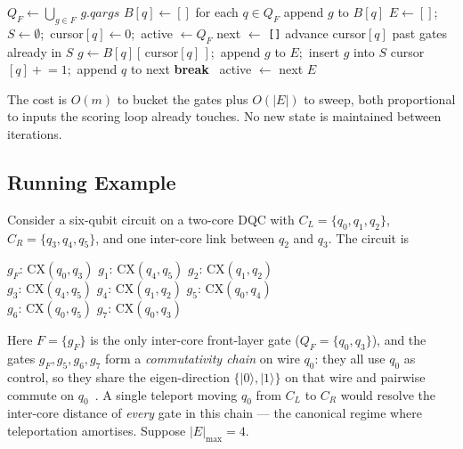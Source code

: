 \documentclass[conference]{IEEEtran}
\begin{document}
\begin{algorithm}[t]
\caption{\texttt{ExtendedSet-Wire}$(C, F, |E|)$}
\label{alg:wirebal}
\begin{algorithmic}[1]
\STATE $Q_F \leftarrow \bigcup_{g\in F}\,g.\mathit{qargs}$
\STATE $B[q] \leftarrow []$ for each $q \in Q_F$
    \STATE append $g$ to $B[q]$
  \ENDFOR
\ENDFOR
\STATE $E \leftarrow []$;\ $S \leftarrow \emptyset$;\
       cursor$[q] \leftarrow 0$;\ active $\leftarrow Q_F$
  \STATE next $\leftarrow$ \texttt{[]}
    \STATE advance cursor$[q]$ past gates already in $S$
      \STATE $g \leftarrow B[q][\,\text{cursor}[q]\,]$;\
             append $g$ to $E$;\ insert $g$ into $S$
      \STATE cursor$[q] \mathrel{+}= 1$;\ append $q$ to next
      \IF{$|E| \ge |E|_{\max}$} \textbf{break}\ \ENDIF
    \ENDIF
  \ENDFOR
  \STATE active $\leftarrow$ next
\ENDWHILE
\RETURN $E$
\end{algorithmic}
\end{algorithm}

The cost is $O(m)$ to bucket the gates plus $O(|E|)$ to sweep, both
proportional to inputs the scoring loop already touches.
No new state is maintained between iterations.

\subsection{Running Example}
\label{sec:running}

Consider a six-qubit circuit on a two-core DQC with
$C_L=\{q_0,q_1,q_2\}$, $C_R=\{q_3,q_4,q_5\}$, and one inter-core link
between $q_2$ and $q_3$.
The circuit is
\begin{center}\small
$g_F{:}\,\mathrm{CX}(q_0,q_3)$\quad\quad
$g_1{:}\,\mathrm{CX}(q_4,q_5)$\quad
$g_2{:}\,\mathrm{CX}(q_1,q_2)$\\[2pt]
$g_3{:}\,\mathrm{CX}(q_4,q_5)$\quad
$g_4{:}\,\mathrm{CX}(q_1,q_2)$\quad
$g_5{:}\,\mathrm{CX}(q_0,q_4)$\\[2pt]
$g_6{:}\,\mathrm{CX}(q_0,q_5)$\quad\quad
$g_7{:}\,\mathrm{CX}(q_0,q_3)$
\end{center}
Here $F=\{g_F\}$ is the only inter-core front-layer gate
($Q_F=\{q_0,q_3\}$), and the gates $g_F, g_5, g_6, g_7$ form a
\emph{commutativity chain} on wire $q_0$:
they all use $q_0$ as control, so they share the eigen-direction
$\{|0\rangle,|1\rangle\}$ on that wire and pairwise commute on
$q_0$~\cite{hong2024commutativity}.
A single teleport moving $q_0$ from $C_L$ to $C_R$ would resolve the
inter-core distance of \emph{every} gate in this chain --- the
canonical regime where teleportation amortises.
Suppose $|E|_{\max}=4$.
\end{document}
